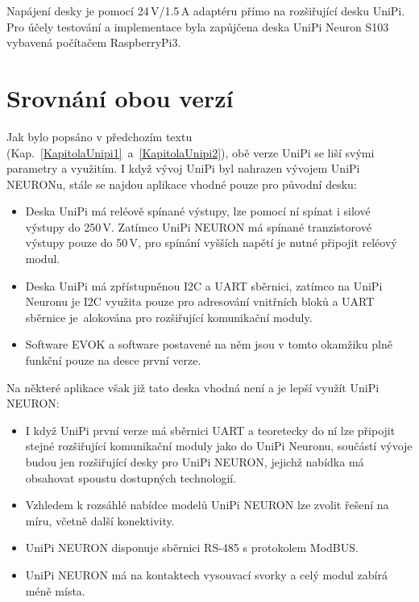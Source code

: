 Napájení desky je pomocí 24\,V/1.5\,A adaptéru přímo na rozšiřující desku UniPi. Pro účely testování a implementace byla zapůjčena deska UniPi Neuron S103 vybavená počítačem RaspberryPi3.



\section{Srovnání obou verzí}

Jak bylo popsáno v předchozím textu (Kap.~\ref{KapitolaUnipi1}~a~\ref{KapitolaUnipi2}), obě verze UniPi se liší svými parametry a využitím. I když vývoj UniPi byl nahrazen vývojem UniPi NEURONu, stále se najdou aplikace vhodné pouze pro původní desku:


\begin{itemize}
	\item Deska UniPi má reléově spínané výstupy, lze pomocí ní spínat i silové výstupy do 250\,V. Zatímco UniPi NEURON má spínané tranzistorové výstupy pouze do 50\,V, pro spínání vyšších napětí je nutné připojit reléový modul.
	\item Deska UniPi má zpřístupněnou I2C a UART sběrnici, zatímco na UniPi Neuronu je I2C využita pouze pro adresování vnitřních bloků a UART sběrnice je~alokována pro rozšiřující komunikační moduly.
	\item Software EVOK a software postavené na něm jsou v tomto okamžiku plně funkční pouze na desce první verze.	
\end{itemize}

\vspace{10pt}
Na některé aplikace však již tato deska vhodná není a je lepší využít UniPi NEURON:

\begin{itemize}
	\item I když UniPi první verze má sběrnici UART a teoretecky do ní lze připojit stejné rozšiřující komunikační moduly jako do UniPi Neuronu, součástí vývoje budou jen rozšiřující desky pro UniPi NEURON, jejichž nabídka má obsahovat spoustu dostupných technologií.
	\item Vzhledem k rozsáhlé nabídce modelů UniPi NEURON lze zvolit řešení na míru, včetně další konektivity.
	\item UniPi NEURON disponuje sběrnici RS-485 s protokolem ModBUS.
	\item UniPi NEURON má na kontaktech vysouvací svorky a celý modul zabírá méně místa.	
\end{itemize}

